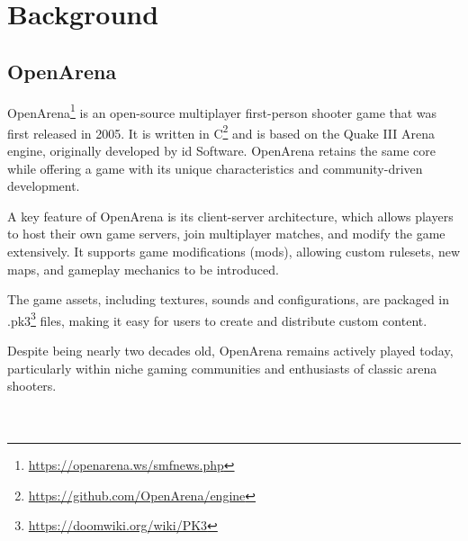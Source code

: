 \chapter{Background}
\label{chapter:background}

\section{OpenArena}
\label{sec:openarena}

OpenArena\footnote{\url{https://openarena.ws/smfnews.php}} is an open-source multiplayer first-person shooter game that was first released in 2005.
It is written in C\footnote{\url{https://github.com/OpenArena/engine}} and is based on the Quake III Arena engine, originally developed by id Software.
OpenArena retains the same core while offering a game with its unique characteristics and community-driven development.

A key feature of OpenArena is its client-server architecture, which allows players to host their own game servers, join multiplayer matches, and modify the game extensively.
It supports game modifications (mods), allowing custom rulesets, new maps, and gameplay mechanics to be introduced.

The game assets, including textures, sounds and configurations, are packaged in .pk3\footnote{\url{https://doomwiki.org/wiki/PK3}} files, making it easy for users to create and distribute custom content.

Despite being nearly two decades old, OpenArena remains actively played today, particularly within niche gaming communities and enthusiasts of classic arena shooters.
\\
\\
\\
